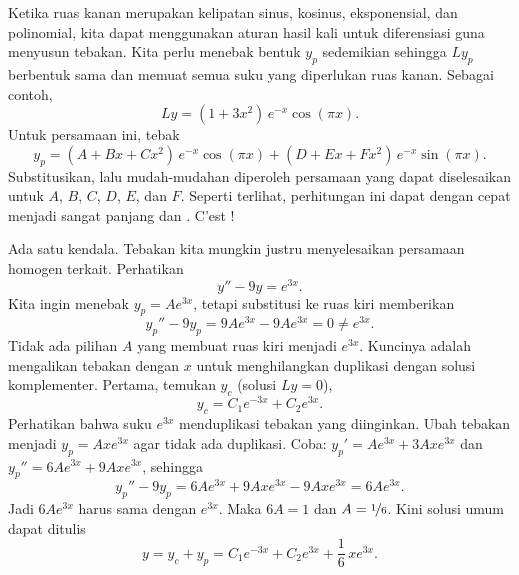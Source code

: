 \medskip

Ketika ruas kanan merupakan kelipatan sinus, kosinus, eksponensial, dan polinomial, kita dapat menggunakan aturan hasil kali untuk diferensiasi guna menyusun tebakan. Kita perlu menebak bentuk $y_p$ sedemikian sehingga $Ly_p$ berbentuk sama dan memuat semua suku yang diperlukan ruas kanan. Sebagai contoh,
\begin{equation*}
Ly = (1+3x^2)\,e^{-x}\cos (\pi x) .
\end{equation*}
Untuk persamaan ini, tebak
\begin{equation*}
y_p = (A + Bx + Cx^2)\,e^{-x} \cos (\pi x) +
(D + Ex + Fx^2)\,e^{-x} \sin (\pi x) .
\end{equation*}
Substitusikan, lalu mudah-mudahan diperoleh persamaan yang dapat diselesaikan untuk $A$, $B$, $C$, $D$, $E$, dan $F$. Seperti terlihat, perhitungan ini dapat dengan cepat menjadi sangat panjang dan . %
C'est ! %

\medskip

Ada satu kendala. Tebakan kita mungkin justru menyelesaikan persamaan homogen terkait. Perhatikan
\begin{equation*}
y'' - 9y = e^{3x} .
\end{equation*}
Kita ingin menebak $y_p = Ae^{3x}$, tetapi substitusi ke ruas kiri memberikan
\begin{equation*}
y_p''-9y_p = 9Ae^{3x} - 9Ae^{3x} = 0 \neq e^{3x} .
\end{equation*}
Tidak ada pilihan $A$ yang membuat ruas kiri menjadi $e^{3x}$. Kuncinya adalah mengalikan tebakan dengan $x$ untuk menghilangkan duplikasi dengan solusi komplementer. Pertama, temukan $y_c$ (solusi $Ly = 0$),
\begin{equation*}
y_c = C_1 e^{-3x} + C_2 e^{3x} .
\end{equation*}
Perhatikan bahwa suku $e^{3x}$ menduplikasi tebakan yang diinginkan. Ubah tebakan menjadi $y_p = Axe^{3x}$ agar tidak ada duplikasi. Coba: $y_p' = Ae^{3x} + 3Axe^{3x}$ dan $y_p'' = 6Ae^{3x} + 9Axe^{3x}$, sehingga
\begin{equation*}
y_p'' -9y_p = 6Ae^{3x} + 9Axe^{3x} - 9Axe^{3x} =
6Ae^{3x} .
\end{equation*}
Jadi $6Ae^{3x}$ harus sama dengan $e^{3x}$. Maka $6A = 1$ dan $A=\nicefrac{1}{6}$. Kini solusi umum dapat ditulis
\begin{equation*}
y = y_c + y_p =
C_1 e^{-3x} + C_2 e^{3x} + \frac{1}{6}\,xe^{3x} .
\end{equation*}

